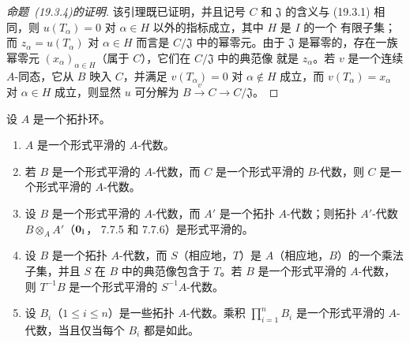 \begin{proof}[命题~{\rm(19.3.4)}的证明]
该引理既已证明，并且记号 $C$ 和 $\mathfrak J$ 的含义与 (19.3.1) 相同，则
$u(T_\alpha)=0$ 对 $\alpha\in H$ 以外的指标成立，其中 $H$ 是 $I$ 的一个
有限子集；而 $z_\alpha=u(T_\alpha)$ 对 $\alpha\in H$ 而言是
$C/\mathfrak J$ 中的幂零元。由于 $\mathfrak J$ 是幂零的，存在一族幂零元
$(x_\alpha)_{\alpha\in H}$（属于 $C$），它们在 $C/\mathfrak J$ 中的典范像
就是 $z_\alpha$。若 $v$ 是一个连续 $A$-同态，它从 $B$ 映入 $C$，并满足
$v(T_\alpha)=0$ 对 $\alpha\notin H$ 成立，而
$v(T_\alpha)=x_\alpha$ 对 $\alpha\in H$ 成立，则显然 $u$ 可分解为
$B\xrightarrow{v}C\to C/\mathfrak J$。
\end{proof}

\begin{proposition}[19.3.5]
\label{0.19.3.5-fr}
设 $A$ 是一个拓扑环。
\begin{enumerate}
  \item[(i)] $A$ 是一个形式平滑的 $A$-代数。
  \item[(ii)] 若 $B$ 是一个形式平滑的 $A$-代数，而 $C$ 是一个形式平滑的
  $B$-代数，则 $C$ 是一个形式平滑的 $A$-代数。
  \item[(iii)] 设 $B$ 是一个形式平滑的 $A$-代数，而 $A'$ 是一个拓扑
  $A$-代数；则拓扑 $A'$-代数 $B\otimes_A A'$（$\mathbf 0_{\rm I}$，
  7.7.5 和 7.7.6）是形式平滑的。
  \item[(iv)] 设 $B$ 是一个拓扑 $A$-代数，而 $S$（相应地，$T$）是
  $A$（相应地，$B$）的一个乘法子集，并且 $S$ 在 $B$ 中的典范像包含于
  $T$。若 $B$ 是一个形式平滑的 $A$-代数，则 $T^{-1}B$ 是一个形式平滑的
  $S^{-1}A$-代数。
  \item[(v)] 设 $B_i$（$1\leq i\leq n$）是一些拓扑 $A$-代数。乘积
  $\prod_{i=1}^n B_i$ 是一个形式平滑的 $A$-代数，当且仅当每个 $B_i$
  都是如此。
\end{enumerate}
\end{proposition}


